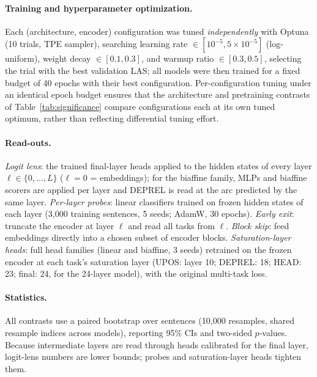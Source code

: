 \documentclass[letterpaper]{article}
\begin{document}
\paragraph{Training and hyperparameter optimization.}
Each (architecture, encoder) configuration was tuned \emph{independently}
with Optuna (10 trials, TPE sampler), searching learning rate
$\in [10^{-5}, 5{\times}10^{-5}]$ (log-uniform), weight decay
$\in [0.1, 0.3]$, and warmup ratio $\in [0.3, 0.5]$, selecting the trial with
the best validation LAS; all models were then trained for a fixed budget of
40 epochs with their best configuration. Per-configuration tuning under an
identical epoch budget ensures that the architecture and pretraining
contrasts of Table~\ref{tab:significance} compare configurations each at its
own tuned optimum, rather than reflecting differential tuning effort.

\paragraph{Read-outs.}
\emph{Logit lens}: the trained final-layer heads applied to the hidden states
of every layer $\ell \in \{0, \dots, L\}$ ($\ell{=}0$ = embeddings); for the
biaffine family, MLPs and biaffine scorers are applied per layer and DEPREL is
read at the arc predicted by the same layer.
\emph{Per-layer probes}: linear classifiers trained on frozen hidden states of
each layer (3{,}000 training sentences, 5 seeds; AdamW, 30 epochs).
\emph{Early exit}: truncate the encoder at layer $\ell$ and read all tasks
from $\ell$.
\emph{Block skip}: feed embeddings directly into a chosen subset of encoder
blocks.
\emph{Saturation-layer heads}: full head families (linear and biaffine, 3
seeds) retrained on the frozen encoder at each task's saturation layer
(UPOS: layer 10; DEPREL: 18; HEAD: 23; final: 24, for the 24-layer model),
with the original multi-task loss.

\paragraph{Statistics.}
All contrasts use a paired bootstrap over sentences (10{,}000 resamples,
shared resample indices across models), reporting 95\% CIs and two-sided
$p$-values. Because intermediate layers are read through heads calibrated for
the final layer, logit-lens numbers are lower bounds; probes and
saturation-layer heads tighten them.

\end{document}
